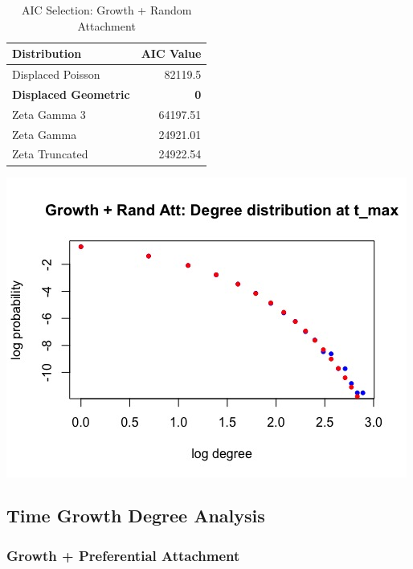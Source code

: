 \documentclass[12pt, a4paper]{article}
\begin{document}
\begin{table}[H]
    \centering
    \begin{tabular}{l r}
        Distribution & AIC Value\\
        \hline
        Displaced Poisson & 82119.5\\
        \textbf{Displaced Geometric} & \textbf{0}\\
        Zeta Gamma 3 & 64197.51\\
        Zeta Gamma & 24921.01\\ 
        Zeta Truncated & 24922.54\\
    \end{tabular}
    \caption{AIC Selection: Growth + Random Attachment}
    \label{table:grow_ran_att_3}
\end{table}

\begin{minipage}[t]{\linewidth}
    \includegraphics[width=\textwidth]{degree_tmax_grow_random_att}
    \captionsetup{type=figure}
    \label{fig:degree_tmax_grow_pref_att}
  \end{minipage}

\subsection{Time Growth Degree Analysis}

\subsubsection{Growth + Preferential Attachment}
\end{document}
